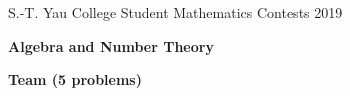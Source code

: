 \documentclass[10pt]{article}
\begin{document}






\begin{center}
S.-T. Yau College Student Mathematics Contests 2019

\vspace{0.1cm}

\Large {\bf Algebra and Number Theory}

\vspace{0.1cm}

\large {\bf Team (5 problems)}

\vspace{0.1cm}
\end{center}
\end{document}
